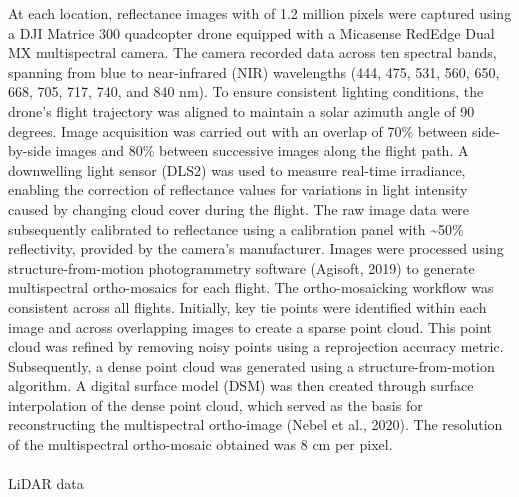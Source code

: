 \documentclass[
  letterpaper,
  DIV=11,
  numbers=noendperiod]{scrartcl}
\makeatletter
\let\oldparagraph\paragraph
\renewcommand{\paragraph}{
    \@ifstar
      \xxxParagraphStar
      \xxxParagraphNoStar
  }
\newcommand{\xxxParagraphStar}[1]{\oldparagraph*{#1}\mbox{}}
\newcommand{\xxxParagraphNoStar}[1]{\oldparagraph{#1}\mbox{}}
\makeatother
\begin{document}
At each location, reflectance images with of 1.2 million pixels were
captured using a DJI Matrice 300 quadcopter drone equipped with a
Micasense RedEdge Dual MX multispectral camera. The camera recorded data
across ten spectral bands, spanning from blue to near-infrared (NIR)
wavelengths (444, 475, 531, 560, 650, 668, 705, 717, 740, and 840 nm).
To ensure consistent lighting conditions, the drone's flight trajectory
was aligned to maintain a solar azimuth angle of 90 degrees. Image
acquisition was carried out with an overlap of 70\% between side-by-side
images and 80\% between successive images along the flight path. A
downwelling light sensor (DLS2) was used to measure real-time
irradiance, enabling the correction of reflectance values for variations
in light intensity caused by changing cloud cover during the flight. The
raw image data were subsequently calibrated to reflectance using a
calibration panel with \textasciitilde50\% reflectivity, provided by the
camera's manufacturer. Images were processed using structure-from-motion
photogrammetry software (Agisoft, 2019) to generate multispectral
ortho-mosaics for each flight. The ortho-mosaicking workflow was
consistent across all flights. Initially, key tie points were identified
within each image and across overlapping images to create a sparse point
cloud. This point cloud was refined by removing noisy points using a
reprojection accuracy metric. Subsequently, a dense point cloud was
generated using a structure-from-motion algorithm. A digital surface
model (DSM) was then created through surface interpolation of the dense
point cloud, which served as the basis for reconstructing the
multispectral ortho-image (Nebel et al., 2020). The resolution of the
multispectral ortho-mosaic obtained was 8 cm per pixel.

\paragraph{LiDAR data}\label{lidar-data}
\end{document}
